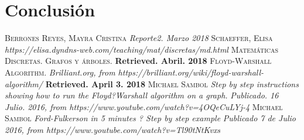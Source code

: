 \documentclass{article}%
\begin{document}
\break

\section*{Conclusi\'on}

\begin{thebibliography}{5}
 \textsc{Berrones Reyes, Mayra Cristina} \textit{Reporte2. Marzo 2018}
 \textsc{Schaeffer, Elisa} \textit{https://elisa.dyndns-web.com/teaching/mat/discretas/md.html} \textsc{Matem\'aticas Discretas. Grafos y \'arboles.}  \textbf{Retrieved. Abril. 2018}
 \textsc{Floyd-Warshall Algorithm.} \textit{Brilliant.org, from https://brilliant.org/wiki/floyd-warshall-algorithm/} \textbf{Retrieved. April 3. 2018}
\textsc{Michael Sambol} \textit{Step by step instructions showing how to run the Floyd?Warshall algorithm on a graph.} \textit{Publicado. 16 Julio. 2016, from https://www.youtube.com/watch?v=4OQeCuLYj-4}
 \textsc{Michael Sambol} \textit{Ford-Fulkerson in 5 minutes ? Step by step example} \textit{Publicado 7 de Julio 2016, from https://www.youtube.com/watch?v=Tl90tNtKvxs}

\end{thebibliography}
\end{document}

